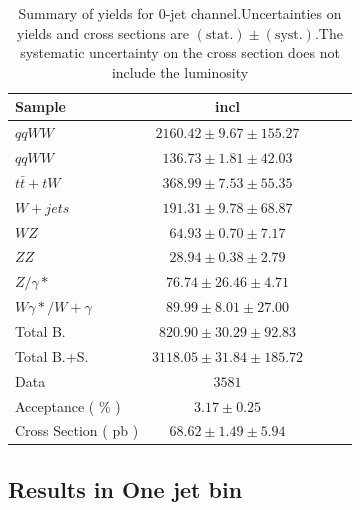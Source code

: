 \begin{table}[!ht]
{\small
\begin{center}
\begin{tabular}{|l|c|c|c|c|}
\hline
Sample	& incl	\\ \hline
$qqWW$	& $2160.42 \pm 9.67 \pm 155.27 $	\\ 
$qqWW$	& $136.73 \pm 1.81 \pm 42.03 $	\\ 
$t\bar{t} + tW$	& $368.99 \pm 7.53 \pm 55.35 $	\\ 
$W+jets$	& $191.31 \pm 9.78 \pm 68.87 $	\\ 
$WZ$	& $64.93 \pm 0.70 \pm 7.17 $	\\ 
$ZZ$	& $28.94 \pm 0.38 \pm 2.79 $	\\ 
$Z/\gamma*$	& $76.74 \pm 26.46 \pm 4.71 $	\\ 
$W\gamma*/W+\gamma$	& $89.99 \pm 8.01 \pm 27.00 $	\\ 
\hline \hline 
Total B.	& $820.90 \pm 30.29 \pm 92.83 $	\\ \hline \hline 
Total B.+S.	& $3118.05 \pm 31.84 \pm 185.72 $	\\ \hline \hline
Data	& $3581$ 	\\ \hline \hline
Acceptance ( \% )	& $3.17 \pm 0.25 	$\\ 
Cross Section ( pb )	& $68.62 \pm 1.49 \pm 5.94$ 	\\ \hline
\end{tabular}
\caption{Summary of yields for 0-jet channel.Uncertainties on yields and cross sections are $\mathrm{(stat.)} \pm \mathrm{(syst.)}$.The systematic uncertainty on the cross section does not include the luminosity}
\label{tab:datayields_wwxsec_0j}
\end{center}}
\end{table}
\clearpage


\subsection{Results in One jet bin}

